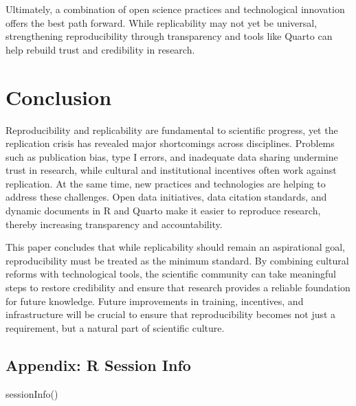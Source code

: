 \documentclass[
  a4paper,
]{article}
\newenvironment{Shaded}{\begin{snugshade}}{\end{snugshade}}
\newcommand{\FunctionTok}[1]{\textcolor[rgb]{0.28,0.35,0.67}{#1}}
\newcommand{\NormalTok}[1]{\textcolor[rgb]{0.00,0.23,0.31}{#1}}
\begin{document}
Ultimately, a combination of open science practices and technological
innovation offers the best path forward. While replicability may not yet
be universal, strengthening reproducibility through transparency and
tools like Quarto can help rebuild trust and credibility in research.

\section{Conclusion}\label{conclusion}

Reproducibility and replicability are fundamental to scientific
progress, yet the replication crisis has revealed major shortcomings
across disciplines. Problems such as publication bias, type I errors,
and inadequate data sharing undermine trust in research, while cultural
and institutional incentives often work against replication. At the same
time, new practices and technologies are helping to address these
challenges. Open data initiatives, data citation standards, and dynamic
documents in R and Quarto make it easier to reproduce research, thereby
increasing transparency and accountability.

This paper concludes that while replicability should remain an
aspirational goal, reproducibility must be treated as the minimum
standard. By combining cultural reforms with technological tools, the
scientific community can take meaningful steps to restore credibility
and ensure that research provides a reliable foundation for future
knowledge. Future improvements in training, incentives, and
infrastructure will be crucial to ensure that reproducibility becomes
not just a requirement, but a natural part of scientific culture.

\subsection{Appendix: R Session Info}\label{appendix-r-session-info}

\begin{Shaded}
\begin{Highlighting}[]
\FunctionTok{sessionInfo}\NormalTok{()}
\end{Highlighting}
\end{Shaded}
\end{document}
